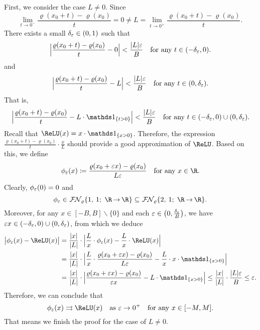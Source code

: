 \documentclass[11pt,a4paper]{article}
\begin{document}
First, we consider the case $L\neq 0$. Since
\begin{equation*}
		\lim_{t\to 0^-}\frac{\varrho (x_0+t)-\varrho (x_0)}{t}=0
	\neq
L= \lim_{t\to 0^+}\frac{\varrho (x_0+t)-\varrho (x_0)}{t}.
\end{equation*}
There exists a small $\delta_\varepsilon\in (0,1)$ such that
\begin{equation*}%
	\Big|\frac{\varrho (x_0+t  )-\varrho (x_0)}{t}-0\Big|<\frac{|L|\eps}{B}\quad \tn{for any $t\in (-\delta_\eps,0)$.}
\end{equation*}
and
\begin{equation*}%
	\Big|\frac{\varrho (x_0+t  )-\varrho (x_0)}{t }-L\Big|<\frac{|L|\eps}{B}\quad \tn{for any $t\in (0,\delta_\eps)$.}
\end{equation*}
That is,
\begin{equation*}%
	\Big|\frac{\varrho (x_0+t  )-\varrho (x_0)}{t}- L \cdot\one_{\{t>0\}} \Big|
	<\frac{|L|\eps}{B}
    \quad \tn{for any $t\in (-\delta_\eps,0)\cup(0,\delta_\eps)$.}
\end{equation*}
Recall that \( \ReLU(x) = x \cdot \one_{\{x > 0\}} \).  
Therefore, the expression \( \frac{\varrho (x_0 + t) - \varrho (x_0)}{t} \cdot \frac{x}{L} \) should provide a good approximation of \( \ReLU \). Based on this, we define  
\begin{equation*}
	\phi_{\eps}(x)\coloneqq\frac{\varrho (x_0+\eps x)-\varrho (x_0)}{L\eps}\quad \tn{for any $x\in \R$.}
\end{equation*}
Clearly, $\phi_\varepsilon(0)=0$ and 
\[\phi_\eps\in \nn{\varrho}{1}{1}{\R}{\R}\subseteq \nn{\varrho}{2}{1}{\R}{\R}.\]
Moreover, for any $x\in [-B,B]\backslash \{0\}$ and each $\varepsilon\in \big(0,\tfrac{\delta_\varepsilon}{B}\big)$, we have $\varepsilon x\in (-\delta_\varepsilon,0)\cup(0,\delta_\varepsilon)$,	
from which we deduce
\begin{equation*}
	\begin{split}
    \big|\phi_\eps(x)-\ReLU(x)\big|
   & =\frac{|x|}{|L|}\cdot\Big|\frac{L}{x}\cdot \phi_\eps(x)-\frac{L}{x}\cdot\ReLU(x)\Big|
\\& =\frac{|x|}{|L|}\cdot\Big|\frac{L}{x}\cdot \frac{\varrho (x_0+\eps x)-\varrho (x_0)}{L\eps}-\frac{L}{x}\cdot  x\cdot \one_{\{x>0\}}\Big|
\\& =\frac{|x|}{|L|}\cdot\Big|  \frac{\varrho (x_0+\eps x)-\varrho (x_0)}{ \eps  x}-{L}\cdot \one_{\{x>0\}}\Big|
\le 
\frac{|x|}{|L|}\cdot \frac{|L|\eps}{B}\le \eps.
	\end{split}
\end{equation*}
Therefore, we can conclude that
	\begin{equation*}
	\phi_\eps(x)\rightrightarrows \ReLU(x)\quad \tn{as}\   \eps\to 0^+\quad \tn{for any $x\in [-M,M]$.}
\end{equation*}
That means we finish the proof for the case of $L\neq 0$.
\end{document}

